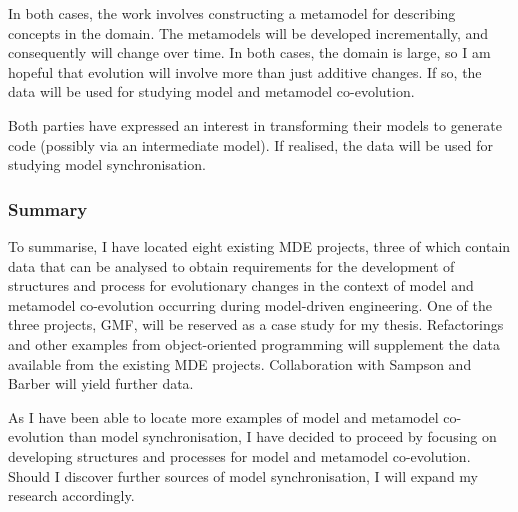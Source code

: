 In both cases, the work involves constructing a metamodel for describing concepts in the domain. The metamodels will be developed incrementally, and consequently will change over time. In both cases, the domain is large, so I am hopeful that evolution will involve more than just additive changes. If so, the data will be used for studying model and metamodel co-evolution.

Both parties have expressed an interest in transforming their models to generate code (possibly via an intermediate model). If realised, the data will be used for studying model synchronisation.


\subsubsection{Summary}
To summarise, I have located eight existing MDE projects, three of which contain data that can be analysed to obtain requirements for the development of structures and process for evolutionary changes in the context of model and metamodel co-evolution occurring during model-driven engineering. One of the three projects, GMF, will be reserved as a case study for my thesis. Refactorings and other examples from object-oriented programming will supplement the data available from the existing MDE projects. Collaboration with Sampson and Barber will yield further data.

As I have been able to locate more examples of model and metamodel co-evolution than model synchronisation, I have decided to proceed by focusing on developing structures and processes for model and metamodel co-evolution. Should I discover further sources of model synchronisation, I will expand my research accordingly.




